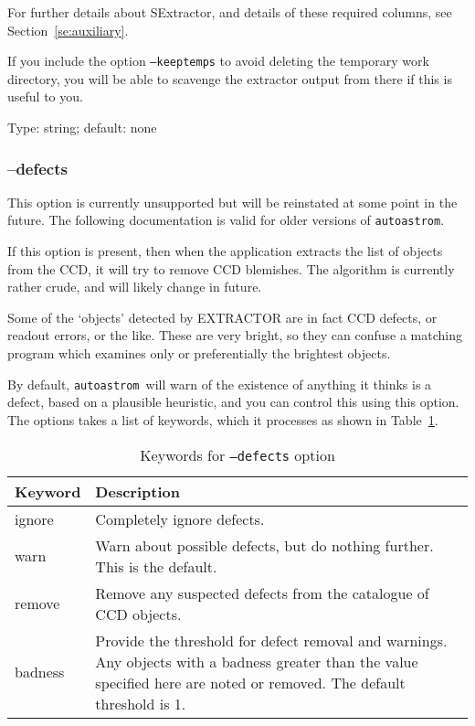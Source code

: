 \documentclass[twoside,11pt]{article}
\newcommand{\xlabel}[1]{}
\newcommand{\autoastrom}{\texttt{autoastrom}}
\begin{document}
For further details about SExtractor, and details of these required columns,
see Section~\ref{se:auxiliary}.

If you include the option \texttt{--keeptemps} to avoid deleting the
temporary work directory, you will be able to scavenge the extractor output
from there if this is useful to you.

Type: string; default: none

\subsubsection{\xlabel{sb_options_defects}--defects\label{sb:options:defects}}

This option is currently unsupported but will be reinstated at some point in
the future. The following documentation is valid for older versions of
\autoastrom.

If this option is present, then when the application extracts the list of
objects from the CCD, it will try to remove CCD blemishes.  The algorithm is
currently rather crude, and will likely change in future.

Some of the `objects' detected by EXTRACTOR are in fact CCD defects, or
readout errors, or the like.  These are very bright, so they can confuse a
matching program which examines only or preferentially the brightest objects.

By default, \autoastrom\ will warn of the existence of anything it thinks is a
defect, based on a plausible heuristic, and you can control this using this
option.  The options takes a list of keywords, which it processes as shown in
Table~\ref{tab:defects}.

\begin{table}
\begin{center}
\begin{tabular}{l|p{10cm}}
Keyword & Description \\ \hline
ignore & Completely ignore defects. \\
warn & Warn about possible defects, but do nothing further. This is the
default. \\
remove & Remove any suspected defects from the catalogue of CCD objects. \\
badness & Provide the threshold for defect removal and warnings. Any objects
with a badness greater than the value specified here are noted or removed. The
default threshold is 1.
\end{tabular}
\end{center}
\caption{\label{tab:defects}Keywords for \texttt{--defects} option}
\end{table}
\end{document}
